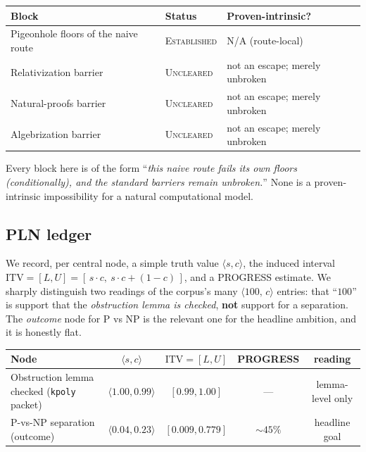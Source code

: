 \begin{center}
\begin{tabular}{lll}
\hline
Block & Status & Proven-intrinsic? \\
\hline
Pigeonhole floors of the naive route & \textsc{Established} & N/A (route-local) \\
Relativization barrier        & \textsc{Uncleared} & not an escape; merely unbroken \\
Natural-proofs barrier        & \textsc{Uncleared} & not an escape; merely unbroken \\
Algebrization barrier         & \textsc{Uncleared} & not an escape; merely unbroken \\
\hline
\end{tabular}
\end{center}

\noindent Every block here is of the form ``\emph{this naive route fails its own
floors (conditionally), and the standard barriers remain unbroken.}'' None is a
proven-intrinsic impossibility for a natural computational model.

\subsection{PLN ledger}
\label{sec:pnp-pln}

We record, per central node, a simple truth value $\langle s,c\rangle$, the
induced interval $\mathrm{ITV}=[L,U]=[\,s\cdot c,\ s\cdot c+(1-c)\,]$, and a
PROGRESS estimate. We sharply distinguish two readings of the corpus's many
$\langle 100,\,c\rangle$ entries: that ``$100$'' is support that the
\emph{obstruction lemma is checked}, \textbf{not} support for a separation. The
\emph{outcome} node for P vs NP is the relevant one for the headline ambition,
and it is honestly flat.

\begin{center}
\begin{tabular}{lcccc}
\hline
Node & $\langle s,c\rangle$ & $\mathrm{ITV}=[L,U]$ & PROGRESS & reading \\
\hline
Obstruction lemma checked (\texttt{kpoly} packet) & $\langle 1.00,0.99\rangle$ & $[0.99,1.00]$ & --- & lemma-level only \\
P-vs-NP separation (outcome) & $\langle 0.04,0.23\rangle$ & $[0.009,0.779]$ & $\sim 45\%$ & headline goal \\
\hline
\end{tabular}
\end{center}

